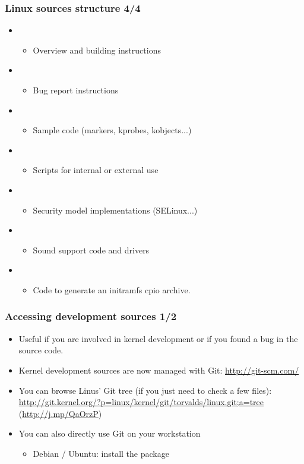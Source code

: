 \begin{frame}
  \frametitle{Linux sources structure 4/4}
  \begin{itemize}
  \item {}
    \begin{itemize}
    \item Overview and building instructions
    \end{itemize}
  \item {}
    \begin{itemize}
    \item Bug report instructions
    \end{itemize}
  \item {}
    \begin{itemize}
    \item Sample code (markers, kprobes, kobjects...)
    \end{itemize}
  \item {}
    \begin{itemize}
    \item Scripts for internal or external use
    \end{itemize}
  \item {}
    \begin{itemize}
    \item Security model implementations (SELinux...)
    \end{itemize}
  \item {}
    \begin{itemize}
    \item Sound support code and drivers
    \end{itemize}
  \item {}
    \begin{itemize}
    \item Code to generate an initramfs cpio archive.
    \end{itemize}
  \end{itemize}
\end{frame}

\begin{frame}
  \frametitle{Accessing development sources 1/2}
  \begin{itemize}
  \item Useful if you are involved in kernel development or if you
    found a bug in the source code.
  \item Kernel development sources are now managed with Git:
    \url{http://git-scm.com/}
  \item You can browse Linus' Git tree (if you just need to check a
    few files):
    \url{http://git.kernel.org/?p=linux/kernel/git/torvalds/linux.git;a=tree}
    (\url{http://j.mp/QaOrzP})
  \item You can also directly use Git on your workstation
    \begin{itemize}
    \item Debian / Ubuntu: install the  package
    \end{itemize}
  \end{itemize}
\end{frame}

